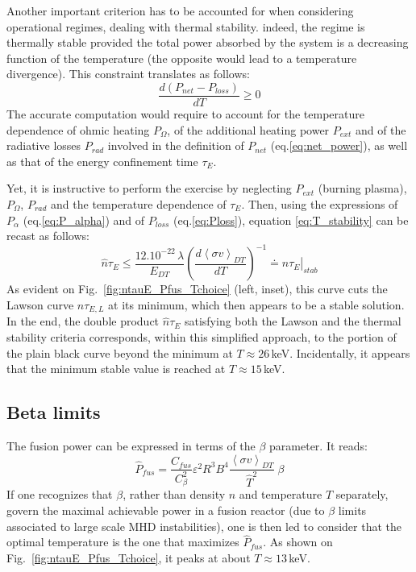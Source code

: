 Another important criterion has to be accounted for when considering operational regimes, dealing with thermal stability. indeed, the regime is thermally stable provided the total power absorbed by the system is a decreasing function of the temperature (the opposite would lead to a temperature divergence). This constraint translates as follows:
\begin{equation}
  \frac{d (P_{net} - P_{loss})}{dT} \geq 0
  \label{eq:T_stability}
\end{equation}
The accurate computation would require to account for the temperature dependence of ohmic heating $P_\Omega$, of the additional heating power $P_{ext}$ and of the radiative losses $P_{rad}$ involved in the definition of $P_{net}$ (eq.\ref{eq:net_power}), as well as that of the energy confinement time $\tau_E$.

Yet, it is instructive to perform the exercise by neglecting $P_{ext}$ (burning plasma), $P_\Omega$, $P_{rad}$ and the temperature dependence of $\tau_E$. Then, using the expressions of $P_\alpha$ (eq.\ref{eq:P_alpha}) and of $P_{loss}$ (eq.\ref{eq:Ploss}), equation \ref{eq:T_stability} can be recast as follows:
\begin{equation}
 \hat n \tau_E \leq \frac{12.10^{-22}\, \lambda}{E_{DT}} 
    \left( \frac{d \left< \sigma v \right>_{DT}}{dT} \right)^{-1} \doteq \left.\hat n \tau_E\right|_{stab}
\label{eq:T_stability_2}
\end{equation}
As evident on Fig.~\ref{fig:ntauE_Pfus_Tchoice} (left, inset), this curve cuts the Lawson curve $\hat n\tau_{E,L}$ at its minimum, which then appears to be a stable solution. In the end, the double product $\hat n\tau_{E}$ satisfying both the Lawson and the thermal stability criteria corresponds, within this simplified approach, to the portion of the plain black curve beyond the minimum at $T\approx 26\,$keV. 
Incidentally, it appears that the minimum stable value is reached at $T\approx 15\,$keV. 


\subsection{Beta limits}

The fusion power can be expressed in terms of the $\beta$ parameter. It reads:
\begin{equation}
\hat P_{fus} = \frac{C_{fus}}{C_\beta^2} \varepsilon^2 R^3 B^4 
 \frac{\left< \sigma v \right>_{DT}}{\hat T^2}\; \beta 
\end{equation}
If one recognizes that $\beta$, rather than density $n$ and temperature $T$ separately, govern the maximal achievable power in a fusion reactor (due to $\beta$ limits associated to large scale MHD instabilities), one is then led to consider that the optimal temperature is the one that maximizes $\hat P_{fus}$. As shown on Fig.~\ref{fig:ntauE_Pfus_Tchoice}, it peaks at about $T\approx 13\,$keV.


